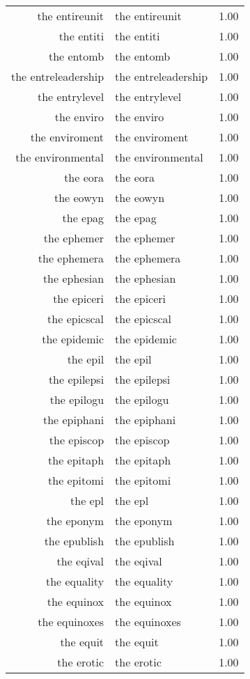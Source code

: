 \begin{table}[ht]
\begin{tabular}{rlr}
  the entireunit & the entireunit & 1.00 \\ 
  the entiti & the entiti & 1.00 \\ 
  the entomb & the entomb & 1.00 \\ 
  the entreleadership & the entreleadership & 1.00 \\ 
  the entrylevel & the entrylevel & 1.00 \\ 
  the enviro & the enviro & 1.00 \\ 
  the enviroment & the enviroment & 1.00 \\ 
  the environmental & the environmental & 1.00 \\ 
  the eora & the eora & 1.00 \\ 
  the eowyn & the eowyn & 1.00 \\ 
  the epag & the epag & 1.00 \\ 
  the ephemer & the ephemer & 1.00 \\ 
  the ephemera & the ephemera & 1.00 \\ 
  the ephesian & the ephesian & 1.00 \\ 
  the epiceri & the epiceri & 1.00 \\ 
  the epicscal & the epicscal & 1.00 \\ 
  the epidemic & the epidemic & 1.00 \\ 
  the epil & the epil & 1.00 \\ 
  the epilepsi & the epilepsi & 1.00 \\ 
  the epilogu & the epilogu & 1.00 \\ 
  the epiphani & the epiphani & 1.00 \\ 
  the episcop & the episcop & 1.00 \\ 
  the epitaph & the epitaph & 1.00 \\ 
  the epitomi & the epitomi & 1.00 \\ 
  the epl & the epl & 1.00 \\ 
  the eponym & the eponym & 1.00 \\ 
  the epublish & the epublish & 1.00 \\ 
  the eqival & the eqival & 1.00 \\ 
  the equality & the equality & 1.00 \\ 
  the equinox & the equinox & 1.00 \\ 
  the equinoxes & the equinoxes & 1.00 \\ 
  the equit & the equit & 1.00 \\ 
  the erotic & the erotic & 1.00 \\ 

\end{tabular}
\end{table}
